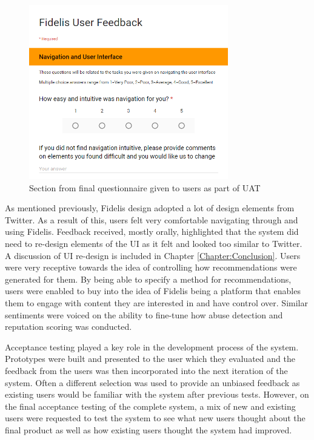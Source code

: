 \begin{figure}[H]
\centering
\includegraphics[height=3in]{Images/Testing/UATQuestionnaire}
\caption{Section from final questionnaire given to users as part of UAT}
\label{fig:UATQuestionnaire}
\end{figure}

As mentioned previously, Fidelis design adopted a lot of design elements from Twitter. As a result of this, users felt very comfortable navigating through and using Fidelis. Feedback received, mostly orally, highlighted that the system did need to re-design elements of the UI as it felt and looked too similar to Twitter. A discussion of UI re-design is included in Chapter \ref{Chapter:Conclusion}. Users were very receptive towards the idea of controlling how recommendations were generated for them. By being able to specify a method for recommendations, users were enabled to buy into the idea of Fidelis being a platform that enables them to engage with content they are interested in and have control over. Similar sentiments were voiced on the ability to fine-tune how abuse detection and reputation scoring was conducted.

Acceptance testing played a key role in the development process of the system. Prototypes were built and presented to the user which they evaluated and the feedback from the users was then incorporated into the next iteration of the system. Often a different selection was used to provide an unbiased feedback as existing users would be familiar with the system after previous tests. However, on the final acceptance testing of the complete system, a mix of new and existing users were requested to test the system to see what new users thought about the final product as well as how existing users thought the system had improved.

